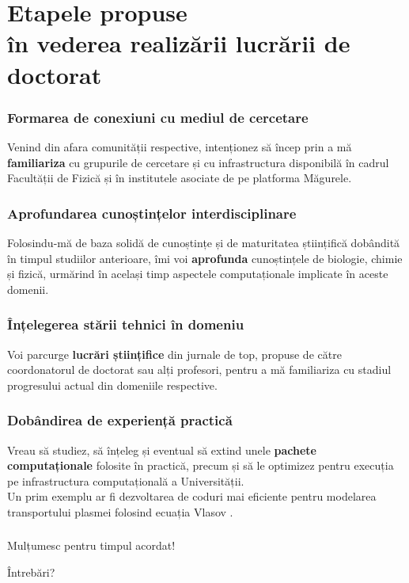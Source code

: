 \section{Etapele propuse \\ în vederea realizării lucrării de doctorat}

\begin{frame}
\frametitle{Formarea de conexiuni cu mediul de cercetare}

Venind din afara comunității respective, intenționez să încep prin a mă \textbf{familiariza} cu grupurile de cercetare și cu infrastructura disponibilă în cadrul Facultății de Fizică și în institutele asociate de pe platforma Măgurele.
\end{frame}

\begin{frame}
\frametitle{Aprofundarea cunoștințelor interdisciplinare}

Folosindu-mă de baza solidă de cunoștințe și de maturitatea științifică dobândită în timpul studiilor anterioare, îmi voi \textbf{aprofunda} cunoștințele de biologie, chimie și fizică, urmărind în același timp aspectele computaționale implicate în aceste domenii.
\end{frame}

\begin{frame}
\frametitle{Înțelegerea stării tehnici în domeniu}

Voi parcurge \textbf{lucrări științifice} din jurnale de top, propuse de către coordonatorul de doctorat sau alți profesori, pentru a mă familiariza cu stadiul progresului actual din domeniile respective.
\end{frame}

\begin{frame}
\frametitle{Dobândirea de experiență practică}

Vreau să studiez, să înțeleg și eventual să extind unele \textbf{pachete computaționale} folosite în practică, precum și să le optimizez pentru execuția pe infrastructura computațională a Universității. \\[1em]

Un prim exemplu ar fi dezvoltarea de coduri mai eficiente pentru modelarea transportului plasmei folosind ecuația Vlasov \autocite{Baran2005}.
\end{frame}

\begin{frame}
\frametitle{}

\centering \Large

Mulțumesc pentru timpul acordat! \\[2em]

\normalsize

Întrebări?
\end{frame}


